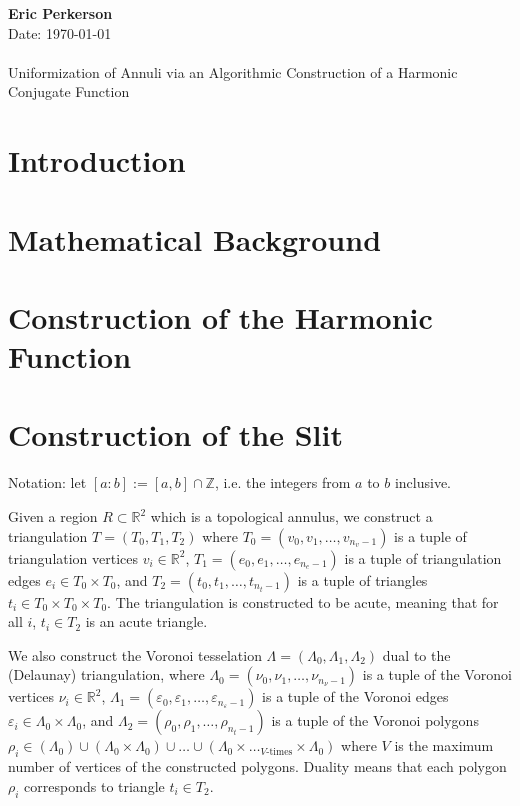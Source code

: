 \documentclass{article}
\newcommand{\solutions}[5]{
	\begin{center}
	{
		\small  #1 #2
		\hfill {\Large \bf {Eric Perkerson} }\\ \vspace{.5pt}
		#3 \hfill
		{
			 Date: #5
		}
	} \\
	\vspace{-1ex}
	\hrulefill\\
	\vspace{4ex}
	{
		\LARGE Uniformization of Annuli via an Algorithmic Construction of a Harmonic Conjugate Function
	} \\
	\vspace{20pt}
	\end{center}
}
\begin{document}
\solutions{}{}{}{1}{\today}

\section{Introduction}

\section{Mathematical Background}

\section{Construction of the Harmonic Function}

\section{Construction of the Slit}

Notation: let $[a : b] := [a, b] \cap \mathbb{Z}$, i.e. the integers from $a$ to $b$ inclusive.

Given a region $R \subset \mathbb{R}^2$ which is a topological annulus, we construct a triangulation $T = (T_0, T_1, T_2)$ where $T_0 = (v_0, v_1, \dots, v_{n_v - 1})$ is a tuple of triangulation vertices $v_i \in \mathbb{R}^2$, $T_1 = (e_0, e_1, \dots, e_{n_e - 1})$ is a tuple of triangulation edges $e_i \in T_0 \times T_0$, and $T_2 = (t_0, t_1, \dots, t_{n_t - 1})$ is a tuple of triangles $t_i \in T_0 \times T_0 \times T_0$. The triangulation is constructed to be acute, meaning that for all $i$, $t_i \in T_2$ is an acute triangle.

We also construct the Voronoi tesselation $\Lambda = (\Lambda_0, \Lambda_1, \Lambda_2)$ dual to the (Delaunay) triangulation, where $\Lambda_0 = (\nu_0, \nu_1, \dots, \nu_{n_\nu - 1})$ is a tuple of the Voronoi vertices $\nu_i \in \mathbb{R}^2$, $\Lambda_1 = (\varepsilon_0, \varepsilon_1, \dots, \varepsilon_{n_\varepsilon - 1})$ is a tuple of the Voronoi edges $\varepsilon_i \in \Lambda_0 \times \Lambda_0$, and $\Lambda_2 = (\rho_0, \rho_1, \dots, \rho_{n_t - 1})$ is a tuple of the Voronoi polygons $\rho_i \in (\Lambda_0) \cup (\Lambda_0 \times \Lambda_0) \cup \dots \cup (\Lambda_0 \times \dots_{V\text{-times}} \times \Lambda_0)$ where $V$ is the maximum number of vertices of the constructed polygons. Duality means that each polygon $\rho_i$ corresponds to triangle $t_i \in T_2$.
\end{document}
